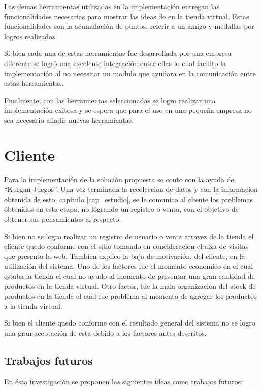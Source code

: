 Las demas herramientas utilizadas en la implementación entregan las funcionalidades necesarias para mostrar
las ideas de {\gam} en la tienda virtual. Estas funcionalidades son la acumulación de puntos, referir a un amigo 
y medallas por logros realizados. 

Si bien cada una de estas herramientas fue desarrollada por una empresa diferente se logró una excelente 
integración entre ellas lo cual facilito la implementación al no necesitar un modulo que ayudara en la comunicación
entre estas herramientas.

Finalmente, con las herramientas seleccionadas se logro realizar una implementación exitosa y se espera que para 
el uso en una pequeña empresa no sea necesario añadir nuevas herramientas. 

\section{Cliente}

Para la implementación de la solución propuesta se conto con la ayuda de ``Kurgan Juegos''. Una vez terminada
la recoleccion de datos y con la informacion obtenida de esto, capítulo \ref{cap_estudio}, se le comunico 
al cliente los problemas obtenidos en esta etapa, no logrando un registro o venta, con el objetivo de obtener 
sus pensamientos al respecto.

Si bien no se logro realizar un registro de usuario o venta atravez de la tienda el cliente quedo conforme con
el sitio tomando en concideracion el alza de visitas que presento la web. Tambien explico la baja de motivación, 
del cliente, en la utilización del sistema. Uno de los factores fue el momento economico en el cual estaba la tienda
el cual no ayudo al momento de presentar una gran cantidad de productos en la tienda virtual. Otro factor, fue la 
mala organización del stock de productos en la tienda el cual fue problema al momento de agregar los productos
a la tienda virtual.

Si bien el cliente quedo conforme con el resultado general del sistema no se logro una gran aceptación de esta
debido a los factores antes descritos. 

\subsection{Trabajos futuros}

En ésta investigación se proponen las siguientes ideas como trabajos futuros:


